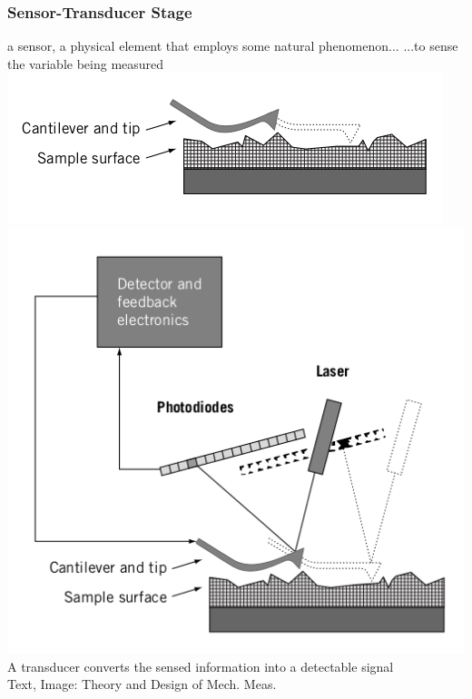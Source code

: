 \documentclass[fleqn]{beamer} %
\begin{document}
			\begin{frame}
				\frametitle{Sensor-Transducer Stage}
				a {\PR sensor}, a physical element that employs some natural phenomenon... ...to sense the variable being measured
				\includegraphics[scale=0.20]{images/sensor_stage.png}\includegraphics[scale=0.20]{images/sensor_transducer_stage.png}\\

				A {\GR transducer} converts the sensed information into a detectable signal \\
				{\tiny Text, Image: Theory and Design of Mech. Meas.}
			\end{frame}
\end{document}
